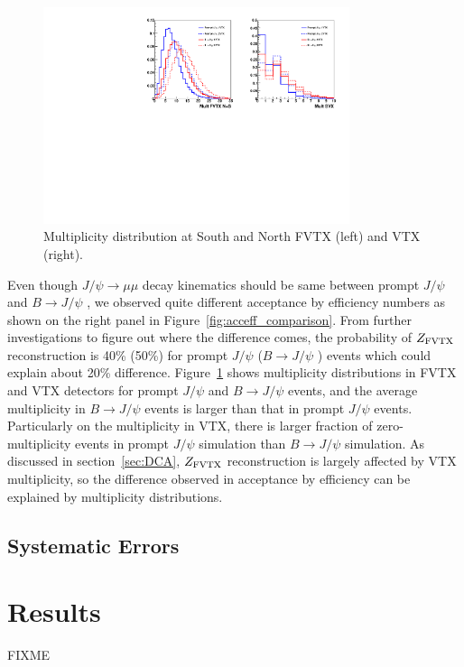 \documentclass[12pt]{article}
\newcommand{\jpsi}{$J/\psi$ }
\newcommand{\fvtxz}{$Z_{\rm FVTX}$ }
\newcommand{\bjpsi}{${B} \to J/\psi$ }
\begin{document}
\begin{figure}[!htb]
\begin{center}
	\includegraphics[width=0.8\textwidth]{Figures/Run12pp510_sim_FVTX_SVX_multiplicity}
	\caption{Multiplicity distribution at South and North FVTX (left) and VTX (right).}
	\label{fig:mulitplicity_sim}
\end{center}
\end{figure}

Even though $J/\psi\to\mu\mu$ decay kinematics should be same between prompt \jpsi and \bjpsi, we observed quite different acceptance by efficiency numbers as shown on the right panel in Figure~\ref{fig:acceff_comparison}.
From further investigations to figure out where the difference comes, the probability of \fvtxz reconstruction is 40\% (50\%) for prompt \jpsi (\bjpsi) events which could explain about 20\% difference.
Figure~\ref{fig:mulitplicity_sim} shows multiplicity distributions in FVTX and VTX detectors for prompt \jpsi and \bjpsi events, and the average multiplicity in \bjpsi events is larger than that in prompt \jpsi events.
Particularly on the multiplicity in VTX, there is larger fraction of zero-multiplicity events in prompt \jpsi simulation than \bjpsi simulation.
As discussed in section~\ref{sec:DCA}, \fvtxz reconstruction is largely affected by VTX multiplicity, so the difference observed in acceptance by efficiency can be explained by multiplicity distributions.


\subsection{Systematic Errors}
\label{sec:SystErrors}


\section{Results}
{\color{red}FIXME}
\end{document}
